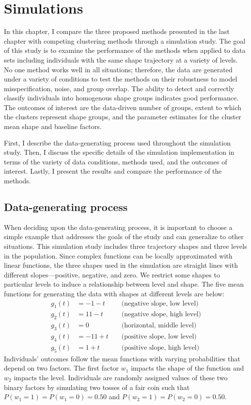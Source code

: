 \chapter{Simulations}

In this chapter, I compare the three proposed methods presented in the last chapter with competing clustering methods through a simulation study. The goal of this study is to examine the performance of the methods when applied to data sets including individuals with the same shape trajectory at a variety of levels. No one method works well in all situations; therefore, the data are generated under a variety of conditions to test the methods on their robustness to model misspecification, noise, and group overlap. The ability to detect and correctly classify individuals into homogenous shape groups indicates good performance. The outcomes of interest are the data-driven number of groups, extent to which the clusters represent shape groups, and the parameter estimates for the cluster mean shape and baseline factors. 

First, I describe the data-generating process used throughout the simulation study. Then, I discuss the specific details of the simulation implementation in terms of the variety of data conditions, methods used, and the outcomes of interest. Lastly, I present the results and compare the performance of the methods.
\section{Data-generating process}
When deciding upon the data-generating process, it is important to choose a simple example that addresses the goals of the study and can generalize to other situations. This simulation study includes three trajectory shapes and three levels in the population. Since complex functions can be locally approximated with linear functions, the three shapes used in the simulation are straight lines with different slopes---positive, negative, and zero. We restrict some shapes to particular levels to induce a relationship between level and shape. The five mean functions for generating the data with shapes at different levels are below:   
\begin{align*}
g_{1}(t) &= -1 - t &&\text{ (negative slope, low level)}\\
g_{2}(t) &= 11 - t&&\text{ (negative slope, high level)}\\
g_{3}(t) &= 0&&\text{ (horizontal, middle level)}\\
g_{4}(t) &= -11 + t&&\text{ (positive slope, low level)}\\
g_{5}(t) &= 1 + t&&\text{ (positive slope, high level)}
\end{align*} 
Individuals' outcomes follow the mean functions with varying probabilities that depend on two factors. The first factor $w_{1}$ impacts the shape of the function and $w_{2}$ impacts the level. Individuals are randomly assigned values of these two binary factors by simulating two tosses of a fair coin such that $P(w_{1}=1) = P(w_{1}=0) = 0.50$ and $P(w_{2}=1) = P(w_{2}=0)=0.50$. 


